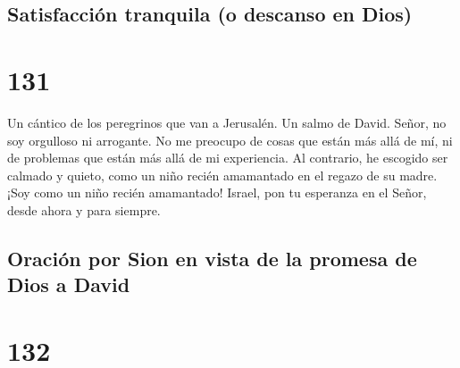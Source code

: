\hypertarget{satisfacciuxf3n-tranquila-o-descanso-en-dios}{%
\subsection{Satisfacción tranquila (o descanso en
Dios)}\label{satisfacciuxf3n-tranquila-o-descanso-en-dios}}

\hypertarget{section-130}{%
\section{131}\label{section-130}}

Un cántico de los peregrinos que van a Jerusalén. Un salmo de David.
 Señor, no soy orgulloso ni arrogante. No me preocupo de
cosas que están más allá de mí, ni de problemas que están más allá de mi
experiencia.  Al contrario, he escogido ser calmado y
quieto, como un niño recién amamantado en el regazo de su madre. ¡Soy
como un niño recién amamantado!  Israel, pon tu esperanza en
el Señor, desde ahora y para siempre.

\hypertarget{oraciuxf3n-por-sion-en-vista-de-la-promesa-de-dios-a-david}{%
\subsection{Oración por Sion en vista de la promesa de Dios a
David}\label{oraciuxf3n-por-sion-en-vista-de-la-promesa-de-dios-a-david}}

\hypertarget{section-131}{%
\section{132}\label{section-131}}

